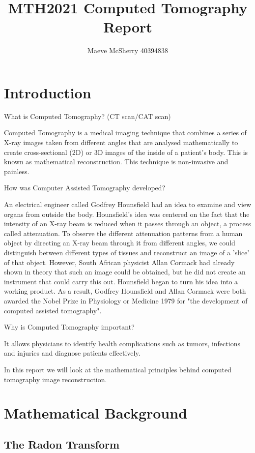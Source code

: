 \documentclass{article}
\title{MTH2021 Computed Tomography Report}
\author{Maeve McSherry 40394838}
\begin{document}
\maketitle


\section{Introduction}

What is Computed Tomography? (CT scan/CAT scan)

Computed Tomography is a medical imaging technique that combines a series of X-ray images taken from different angles that are analysed mathematically to create cross-sectional (2D) or 3D images of the inside of a patient's body. This is known as mathematical reconstruction. This technique is non-invasive and painless. 

How was Computer Assisted Tomography developed?

An electrical engineer called Godfrey Hounsfield had an idea to examine and view organs from outside the body. Hounsfield's idea was centered on the fact that the intensity of an X-ray beam is reduced when it passes through an object, a process called attenuation. To observe the different attenuation patterns from a human object by directing an X-ray beam through it from different angles, we could distinguish between different types of tissues and reconstruct an image of a 'slice' of that object. However, South African physicist Allan Cormack had already shown in theory that such an image could be obtained, but he did not create an instrument that could carry this out. Hounsfield began to turn his idea into a working product. As a result, Godfrey Hounsfield and Allan Cormack were both awarded the Nobel Prize in Physiology or Medicine 1979 for "the development of computed assisted tomography". \cite{nobelprize_ct}

Why is Computed Tomography important?

It allows physicians to identify health complications such as tumors, infections and injuries and diagnose patients effectively.

In this report we will look at the mathematical principles behind computed tomography image reconstruction.


\section{Mathematical Background}

\subsection{The Radon Transform}
\end{document}
